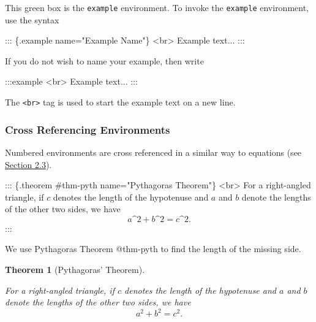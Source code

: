 \documentclass[
  letterpaper,
  oneside]{book}
\newenvironment{Shaded}{\begin{snugshade}}{\end{snugshade}}
\newcommand{\NormalTok}[1]{\textcolor[rgb]{0.00,0.23,0.31}{#1}}
\numberwithin{equation}{section}
\numberwithin{figure}{section}
\theoremstyle{break}
\theoremstyle{plain}
\newtheorem{theorem}{Theorem}[chapter]
\theoremstyle{remark}
\begin{document}
This green box is the \texttt{example} environment. To invoke the
\texttt{example} environment, use the syntax

\begin{Shaded}
\begin{Highlighting}[]
\NormalTok{::: \{.example name="Example Name"\}}
\NormalTok{\textless{}br\textgreater{}}
\NormalTok{Example text...}
\NormalTok{:::}
\end{Highlighting}
\end{Shaded}

If you do not wish to name your example, then write

\begin{Shaded}
\begin{Highlighting}[]
\NormalTok{:::example}
\NormalTok{\textless{}br\textgreater{}}
\NormalTok{Example text...}
\NormalTok{:::}
\end{Highlighting}
\end{Shaded}

The \texttt{\textless{}br\textgreater{}} tag is used to start the
example text on a new line.

\subsubsection*{Cross Referencing
Environments}\label{cross-referencing-environments}

Numbered environments are cross referenced in a similar way to equations
(see \hyperref[mathematics]{Section 2.3}).

\begin{Shaded}
\begin{Highlighting}[]
\NormalTok{::: \{.theorem \#thm{-}pyth name="Pythagoras\textquotesingle{} Theorem"\}}
\NormalTok{\textless{}br\textgreater{}}
\NormalTok{For a right{-}angled triangle, if $c$ denotes the length of the hypotenuse}
\NormalTok{and $a$ and $b$ denote the lengths of the other two sides, we have}
\NormalTok{$$a\^{}2 + b\^{}2 = c\^{}2.$$}
\NormalTok{:::}
  
\NormalTok{We use Pythagoras\textquotesingle{} Theorem @thm{-}pyth to find the length of the missing side.}
\end{Highlighting}
\end{Shaded}

\begin{theorem}[Pythagoras'
Theorem]\protect\hypertarget{thm-pyth}{}\label{thm-pyth}

For a right-angled triangle, if \(c\) denotes the length of the
hypotenuse and \(a\) and \(b\) denote the lengths of the other two
sides, we have \[a^2 + b^2 = c^2.\]

\end{theorem}
\end{document}
